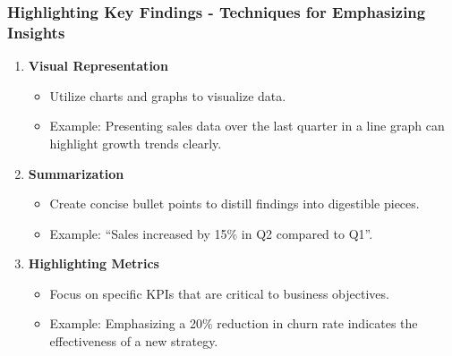 \documentclass{beamer}
\begin{document}
\begin{frame}[fragile]
    \frametitle{Highlighting Key Findings - Techniques for Emphasizing Insights}
    \begin{enumerate}
        \item \textbf{Visual Representation}
            \begin{itemize}
                \item Utilize charts and graphs to visualize data.
                \item Example: Presenting sales data over the last quarter in a line graph can highlight growth trends clearly.
            \end{itemize}

        \item \textbf{Summarization}
            \begin{itemize}
                \item Create concise bullet points to distill findings into digestible pieces.
                \item Example: “Sales increased by 15\% in Q2 compared to Q1”.
            \end{itemize}

        \item \textbf{Highlighting Metrics}
            \begin{itemize}
                \item Focus on specific KPIs that are critical to business objectives.
                \item Example: Emphasizing a 20\% reduction in churn rate indicates the effectiveness of a new strategy.
            \end{itemize}
    \end{enumerate}
\end{frame}
\end{document}
